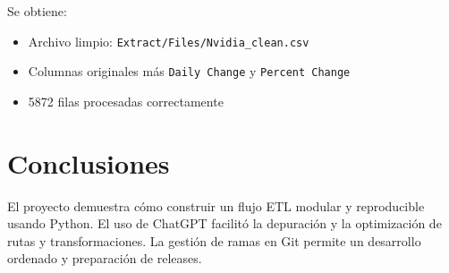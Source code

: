 \documentclass[12pt,a4paper]{article}
\begin{document}
	Se obtiene:
	\begin{itemize}
		\item Archivo limpio: \texttt{Extract/Files/Nvidia\_clean.csv}
		\item Columnas originales más \texttt{Daily Change} y \texttt{Percent Change}
		\item 5872 filas procesadas correctamente
	\end{itemize}
	
	\section{Conclusiones}
	El proyecto demuestra cómo construir un flujo ETL modular y reproducible usando Python. El uso de ChatGPT facilitó la depuración y la optimización de rutas y transformaciones. La gestión de ramas en Git permite un desarrollo ordenado y preparación de releases.
	
\end{document}
